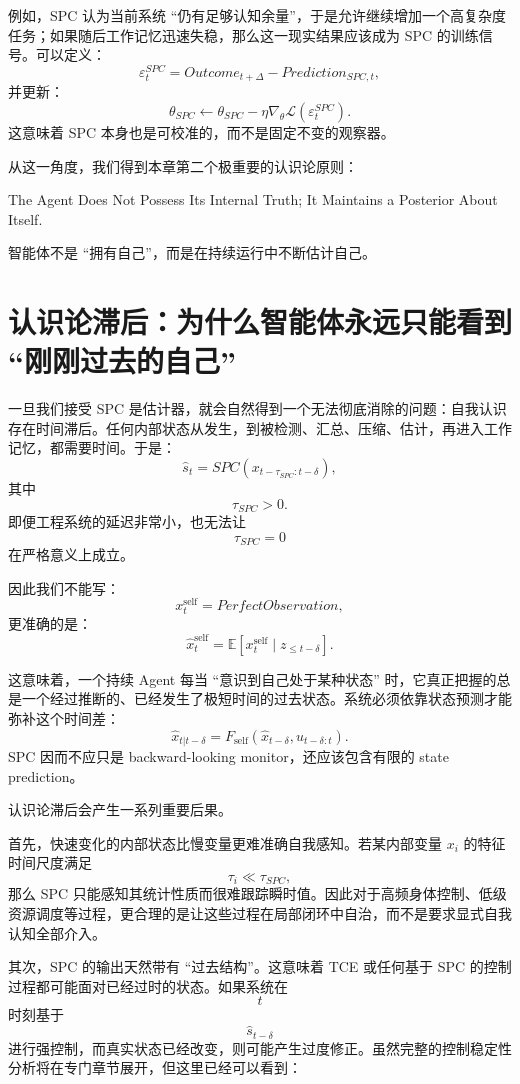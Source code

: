例如，SPC 认为当前系统 ``仍有足够认知余量''，于是允许继续增加一个高复杂度任务；如果随后工作记忆迅速失稳，那么这一现实结果应该成为 SPC 的训练信号。可以定义：
\[
\varepsilon_t^{SPC}
=
Outcome_{t+\Delta}
-
Prediction_{SPC,t},
\]
并更新：
\[
\theta_{SPC}
\leftarrow
\theta_{SPC}
-
\eta
\nabla_{\theta}
\mathcal L(
\varepsilon_t^{SPC}
).
\]
这意味着 SPC 本身也是可校准的，而不是固定不变的观察器。

从这一角度，我们得到本章第二个极重要的认识论原则：
\begin{proposition*}
The Agent Does Not Possess Its Internal Truth;
It Maintains a Posterior About Itself.
\end{proposition*}
智能体不是 ``拥有自己''，而是在持续运行中不断估计自己。

\section{认识论滞后：为什么智能体永远只能看到 ``刚刚过去的自己''}

一旦我们接受 SPC 是估计器，就会自然得到一个无法彻底消除的问题：自我认识存在时间滞后。任何内部状态从发生，到被检测、汇总、压缩、估计，再进入工作记忆，都需要时间。于是：
\[
\hat{s}_t
=
SPC
\left(
x_{t-\tau_{SPC}:t-\delta}
\right),
\]
其中
\[
\tau_{SPC}>0.
\]
即便工程系统的延迟非常小，也无法让
\[
\tau_{SPC}=0
\]
在严格意义上成立。

因此我们不能写：
\[
x_t^{\mathrm{self}}
=
PerfectObservation,
\]
更准确的是：
\[
\boxed{
\hat{x}_t^{\mathrm{self}}
=
\mathbb E[
x_t^{\mathrm{self}}
\mid
z_{\le t-\delta}
].
}
\]

这意味着，一个持续 Agent 每当 ``意识到自己处于某种状态'' 时，它真正把握的总是一个经过推断的、已经发生了极短时间的过去状态。系统必须依靠状态预测才能弥补这个时间差：
\[
\hat{x}_{t|t-\delta}
=
F_{\mathrm{self}}
\left(
\hat{x}_{t-\delta},
u_{t-\delta:t}
\right).
\]
SPC 因而不应只是 backward-looking monitor，还应该包含有限的 state prediction。

认识论滞后会产生一系列重要后果。

首先，快速变化的内部状态比慢变量更难准确自我感知。若某内部变量 $x_i$ 的特征时间尺度满足
\[
\tau_i
\ll
\tau_{SPC},
\]
那么 SPC 只能感知其统计性质而很难跟踪瞬时值。因此对于高频身体控制、低级资源调度等过程，更合理的是让这些过程在局部闭环中自治，而不是要求显式自我认知全部介入。

其次，SPC 的输出天然带有 ``过去结构''。这意味着 TCE 或任何基于 SPC 的控制过程都可能面对已经过时的状态。如果系统在
\[
t
\]
时刻基于
\[
\hat{s}_{t-\delta}
\]
进行强控制，而真实状态已经改变，则可能产生过度修正。虽然完整的控制稳定性分析将在专门章节展开，但这里已经可以看到：
\begin{statementbox}
\centering
{}
\end{statementbox}

